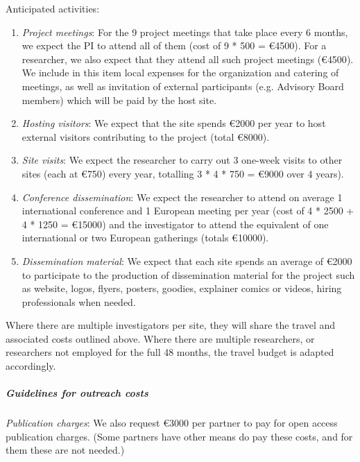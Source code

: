 Anticipated activities:

\begin{enumerate}
\item \emph{Project meetings}: For the 9 project meetings that take place every 6 months, we expect
the PI to attend all of them (cost of 9 * 500 = \euro{4500}). For
a researcher, we also expect that they attend all such project meetings
(\euro{4500}). We include in this item local expenses for the
organization and catering of meetings, as well as invitation of
external participants (e.g. Advisory Board members) which will be paid
by the host site.

\item \emph{Hosting visitors}: We expect that the site spends \euro{2000} per year to host
external visitors contributing to the project (total \euro{8000}).

\item \emph{Site visits}: We expect the researcher to carry out 3 one-week visits to other sites
(each at \euro{750}) every year, totalling 3 * 4 * 750 = \euro{9000}
over 4 years).

\item
\emph{Conference dissemination}: We expect the researcher to attend on average 1
international conference and 1 European meeting per year (cost of 4 *
2500 + 4 * 1250 = \euro{15000}) and the investigator to attend the
equivalent of one international or two
European gatherings (totals \euro{10000}).

\item
\emph{Dissemination material}: We expect that each site spends an
average of \euro{2000} to participate to the production of
dissemination material for the project such as website, logos, flyers,
posters, goodies, explainer comics or videos, hiring professionals
when needed.

\end{enumerate}

Where there are multiple investigators per site, they will share the
travel and associated costs outlined above. Where there are multiple
researchers, or researchers not employed for the full 48 months, the
travel budget is adapted accordingly.



\subparagraph{Guidelines for outreach costs}

\label{sect:budget-outreach-publication-charges}
\emph{Publication charges}: We also request \euro{3000} per partner to pay for open
access publication charges.  (Some partners have other means do pay
these costs, and for them these are not needed.)

